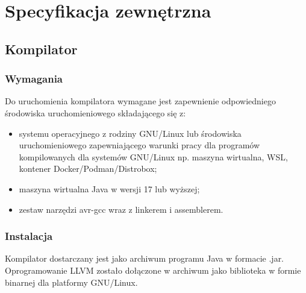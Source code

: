 \chapter{Specyfikacja zewnętrzna}
\label{ch:04}
\section{Kompilator}
\subsection{Wymagania}
Do uruchomienia kompilatora wymagane jest zapewnienie odpowiedniego środowiska uruchomieniowego składającego się z:
\begin{itemize}
\item systemu operacyjnego z rodziny GNU/Linux lub środowiska uruchomieniowego zapewniającego warunki pracy dla programów kompilowanych dla systemów GNU/Linux np. maszyna wirtualna, WSL, kontener Docker/Podman/Distrobox;
\item maszyna wirtualna Java w wersji 17 lub wyższej;
\item zestaw narzędzi avr-gcc wraz z linkerem i assemblerem.
\end{itemize}

\subsection{Instalacja}
Kompilator dostarczany jest jako archiwum programu Java w formacie .jar. Oprogramowanie LLVM zostało dołączone w archiwum jako biblioteka w formie binarnej dla platformy GNU/Linux.

